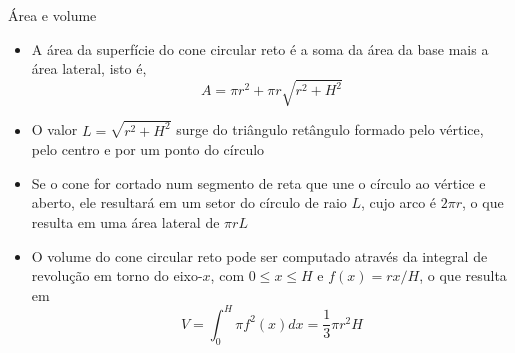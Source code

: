 \begin{frame}[fragile]{Área e volume}

    \begin{itemize}
        \item A área da superfície do cone circular reto é a soma da área da base mais 
            a área lateral, isto é,
        \[
            A = \pi r^2 + \pi r\sqrt{r^2 + H^2}
        \]

        \item O valor $L = \sqrt{r^2 + H^2}$ surge do triângulo retângulo formado pelo vértice, 
            pelo centro e por um ponto do círculo

        \item Se o cone for cortado num segmento de reta que une o círculo ao vértice e 
            aberto, ele resultará em um setor do círculo de raio $L$, cujo arco é $2\pi r$, 
            o que resulta em uma área lateral de $\pi rL$

        \item O volume do cone circular reto pode ser computado através da integral de
            revolução em torno do eixo-$x$, com $0 \leq x \leq H$ e $f(x) = rx/H$, o que 
            resulta em 
            \[
                V = \int_0^H \pi f^2(x) dx = \frac{1}{3}\pi r^2 H
            \]

    \end{itemize}

\end{frame}

